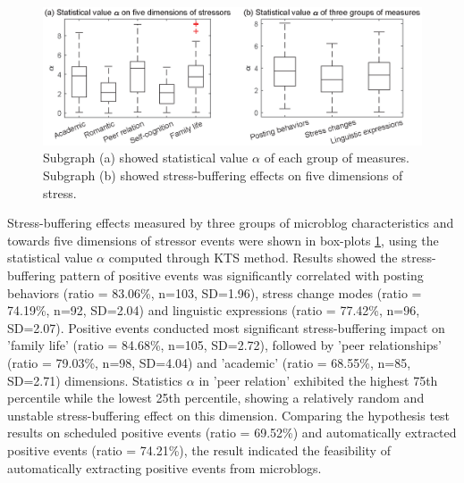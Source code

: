 \begin{figure}[h]
\centering
\includegraphics[width=\linewidth]{figs/cor.eps}%
\caption{\small{ Subgraph (a) showed statistical value $\alpha$ of each group of measures.
Subgraph (b) showed stress-buffering effects on five dimensions of stress.}}
\label{fig:correlation}
\end{figure}

Stress-buffering effects measured by three groups of microblog characteristics and towards five dimensions of stressor events were shown in box-plots \ref{fig:correlation},
using the statistical value $\alpha$ computed through KTS method.
Results showed the stress-buffering pattern of positive events
was significantly correlated with posting behaviors (ratio = 83.06\%, n=103, SD=1.96),
stress change modes (ratio = 74.19\%, n=92, SD=2.04) and linguistic expressions (ratio = 77.42\%, n=96, SD=2.07).
Positive events conducted most significant stress-buffering impact on 'family life' (ratio = 84.68\%, n=105, SD=2.72),
followed by 'peer relationships' (ratio = 79.03\%, n=98, SD=4.04) and 'academic' (ratio = 68.55\%, n=85, SD=2.71) dimensions.
Statistics $\alpha$ in 'peer relation'
exhibited the highest 75th percentile while the lowest 25th percentile,
showing a relatively random and unstable stress-buffering effect on this dimension.
Comparing the hypothesis test results on scheduled positive events (ratio = 69.52\%)
and automatically extracted positive events (ratio = 74.21\%),
the result indicated the feasibility of automatically extracting positive events from microblogs.

